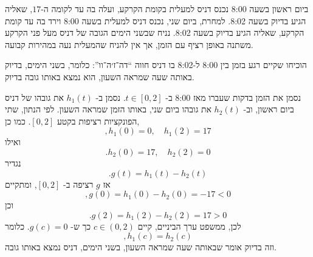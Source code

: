 ביום ראשון בשעה
8:00
נכנס דניס למעלית בקומת הקרקע, ועלה בה עד לקומה
ה-$17$,
שאליה הגיע בדיוק בשעה
8:02.
למחרת, ביום שני,
נכנס דניס למעלית
בשעה
8:00
וירד בה עד קומת הקרקע, שאליה הגיע בדיוק בשעה
8:02.
נניח שבשני הימים הגובה של דניס מעל פני הקרקע משתנה באופן רציף עם הזמן, אך אין להניח שהמעלית נעה במהירות קבועה.

הוכיחו שקיים רגע בזמן  בין
8:00
ל-8:02
בו דניס חווה “דה־ז׳ה־וו”: כלומר, בשני הימים, בדיוק באותה שעה שמראה השעון, הוא נמצא באותו גובה בדיוק.
\begin{solbox}
נסמן את הזמן בדקות שעברו מאז
8:00
ב-
$t\in[0,2]$.
נסמן ב-
$h_1(t)$
את גובהו של דניס ביום ראשון, וב-
$h_2(t)$
את גובהו ביום שני, באותו הזמן שמראה השעון. לפי הנתון, שתי הפונקציות רציפות בקטע
$[0,2]$.
כמו כן,
$$,h_1(0)=0,\quad h_1(2)=17$$
ואילו
$$.h_2(0)=17,\quad h_2(2)=0$$
נגדיר
$$.g(t)=h_1(t)-h_2(t)$$
אז
$g$
רציפה ב-
$[0,2]$,
ומתקיים
$$,g(0)=h_1(0)-h_2(0)=-17<0$$
וכן
$$.g(2)=h_1(2)-h_2(2)=17>0$$
לכן, ממשפט ערך הביניים, קיים
$c\in(0,2)$
כך ש-
$g(c)=0$.
כלומר
$$,h_1(c)=h_2(c)$$
וזה בדיוק אומר שבאותה שעה שמראה השעון, בשני הימים, דניס נמצא באותו גובה.
\end{solbox}
